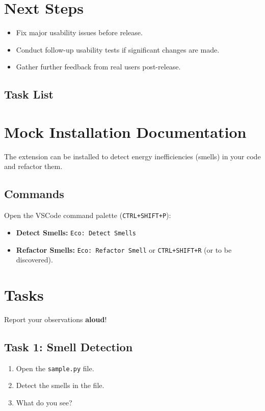 \documentclass[12pt, titlepage]{article}
\begin{document}
\section*{Next Steps}
\begin{itemize}
    \item Fix major usability issues before release.
    \item Conduct follow-up usability tests if significant changes are made.
    \item Gather further feedback from real users post-release.
\end{itemize}

\subsection*{Task List}

\section*{Mock Installation Documentation}
The extension can be installed to detect energy inefficiencies (smells) in your code and refactor them.

\subsection*{Commands}
Open the VSCode command palette (\texttt{CTRL+SHIFT+P}):

\begin{itemize}
    \item \textbf{Detect Smells:} \texttt{Eco: Detect Smells}
    \item \textbf{Refactor Smells:} \texttt{Eco: Refactor Smell} or \texttt{CTRL+SHIFT+R} (or to be discovered).
\end{itemize}

\section*{Tasks}
Report your observations \textbf{aloud}!

\subsection*{Task 1: Smell Detection}
\begin{enumerate}
    \item Open the \texttt{sample.py} file.
    \item Detect the smells in the file.
    \item What do you see?
\end{enumerate}
\end{document}
